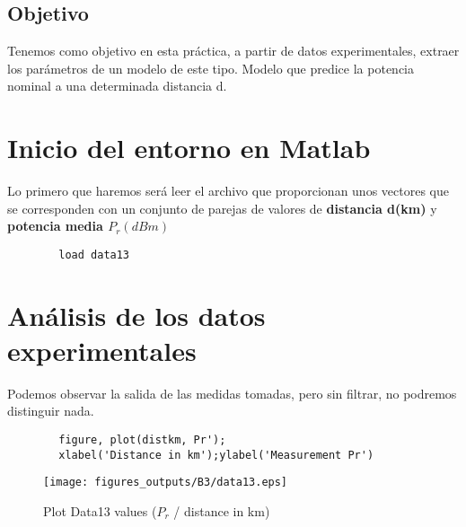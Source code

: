 \documentclass{article}
\begin{document}
    \subsection{Objetivo}
        \par Tenemos como objetivo en esta práctica, a partir de datos experimentales, extraer los parámetros de un modelo de este tipo. Modelo que predice la potencia nominal a una determinada distancia d.
\section{Inicio del entorno en Matlab}
    \par Lo primero que haremos será leer el archivo  que proporcionan unos vectores que se corresponden con un conjunto de parejas de valores de \textbf{distancia d(km) } y \textbf{potencia media $P_r (dBm) $}
    \begin{lstlisting}
        load data13
    \end{lstlisting}
    \clearpage
\section{Análisis de los datos experimentales}
    \par Podemos observar la salida de las medidas tomadas, pero sin filtrar, no podremos distinguir nada.
    \begin{lstlisting}
        figure, plot(distkm, Pr');
        xlabel('Distance in km');ylabel('Measurement Pr')
    \end{lstlisting}
    \begin{figure}[h]
        \centering
        \texttt{[image: figures\_outputs/B3/data13.eps]}
        \caption{Plot Data13 values ($ P_r $ / distance in km) }
        \label{fig:my_label}
    \end{figure}
\end{document}
